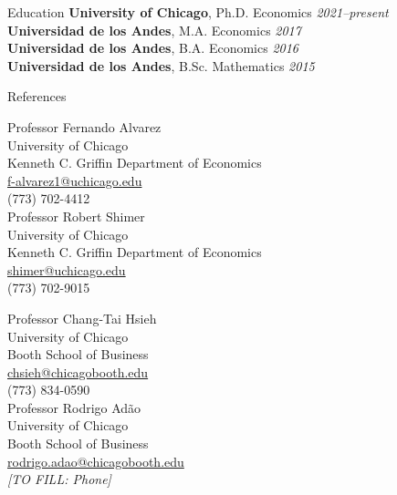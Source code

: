 \documentclass{resume} %
\begin{document}
		\begin{rSection}{Education}
			\textbf{University of Chicago}, Ph.D. Economics \hfill {\em 2021--present}\\
			\textbf{Universidad de los Andes}, M.A. Economics \hfill {\em 2017}\\
			\textbf{Universidad de los Andes}, B.A. Economics \hfill {\em 2016}\\
			\textbf{Universidad de los Andes}, B.Sc. Mathematics \hfill {\em 2015}
	\end{rSection}


	\begin{rSection}{References}
		\begin{minipage}[t]{0.5\textwidth}
				Professor Fernando Alvarez\\
				University of Chicago\\
				Kenneth C. Griffin Department of Economics\\
				\href{mailto:f-alvarez1@uchicago.edu}{f-alvarez1@uchicago.edu}\\
				(773) 702-4412\\

				Professor Robert Shimer\\
				University of Chicago\\
				Kenneth C. Griffin Department of Economics\\
				\href{mailto:shimer@uchicago.edu}{shimer@uchicago.edu}\\
				(773) 702-9015
		\end{minipage}
		\begin{minipage}[t]{0.5\textwidth}
				Professor Chang-Tai Hsieh\\
				University of Chicago\\
				Booth School of Business\\
				\href{mailto:chsieh@chicagobooth.edu}{chsieh@chicagobooth.edu}\\
				(773) 834-0590\\

				Professor Rodrigo Adão\\
				University of Chicago\\
				Booth School of Business\\
				\href{mailto:rodrigo.adao@chicagobooth.edu}{rodrigo.adao@chicagobooth.edu}\\
				\textit{[TO FILL: Phone]}
		\end{minipage}
	\end{rSection}
\end{document}
